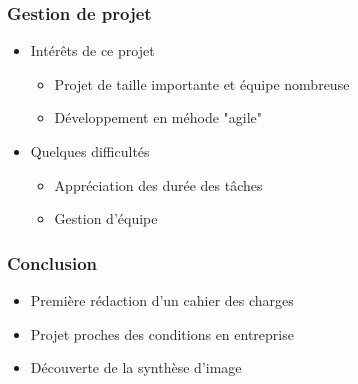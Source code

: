 \documentclass{beamer}
\begin{document}

\begin{frame}
\frametitle{Gestion de projet}
\begin{itemize}[label=$\bullet$]
\item Intérêts de ce projet
	\begin{itemize}[label=$\circ$]
	\item Projet de taille importante et équipe nombreuse
	\item Développement en méhode "agile"
	\end{itemize}
\item Quelques difficultés
	\begin{itemize}[label=$\circ$]
	\item Appréciation des durée des tâches
	\item Gestion d'équipe
	\end{itemize}
\end{itemize}

\end{frame}

\begin{frame}
\frametitle{Conclusion}
\begin{itemize}[label=$\bullet$]
\item Première rédaction d'un cahier des charges
\item Projet proches des conditions en entreprise
\item Découverte de la synthèse d'image
\end{itemize}

\end{frame}

%
	
\end{document}
